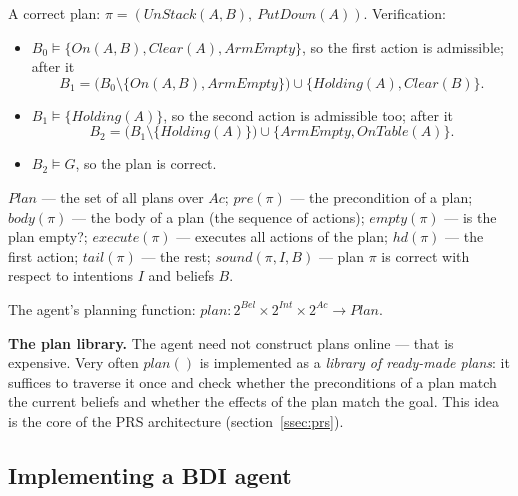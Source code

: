 \documentclass[11pt,a4paper]{article}
\theoremstyle{definition}
\begin{document}
\noindent A correct plan: $\pi = (\mathit{UnStack}(A,B),\ \mathit{PutDown}(A))$. Verification:
\begin{itemize}
\item $B_0 \models \{\mathit{On}(A,B),\mathit{Clear}(A),\mathit{ArmEmpty}\}$, so the first action
  is admissible; after it
  \[
  B_1 = \big(B_0 \setminus \{\mathit{On}(A,B),\mathit{ArmEmpty}\}\big) \cup
  \{\mathit{Holding}(A),\mathit{Clear}(B)\}.
  \]
\item $B_1 \models \{\mathit{Holding}(A)\}$, so the second action is admissible too; after it
  \[
  B_2 = \big(B_1 \setminus \{\mathit{Holding}(A)\}\big) \cup
  \{\mathit{ArmEmpty},\mathit{OnTable}(A)\}.
  \]
\item $B_2 \models G$, so the plan is correct.
\end{itemize}

\begin{defbox}
$\mathit{Plan}$ --- the set of all plans over $\mathit{Ac}$;
$\mathit{pre}(\pi)$ --- the precondition of a plan; $\mathit{body}(\pi)$ --- the body of a plan
(the sequence of actions); $\mathit{empty}(\pi)$ --- is the plan empty?;
$\mathit{execute}(\pi)$ --- executes all actions of the plan;
$\mathit{hd}(\pi)$ --- the first action; $\mathit{tail}(\pi)$ --- the rest;
$\mathit{sound}(\pi,I,B)$ --- plan $\pi$ is correct with respect to intentions $I$ and beliefs $B$.

The agent's planning function:
$\mathit{plan} : 2^{\mathit{Bel}} \times 2^{\mathit{Int}} \times 2^{\mathit{Ac}} \to \mathit{Plan}$.
\end{defbox}

\textbf{The plan library.} The agent need not construct plans online --- that is expensive. Very
often $\mathit{plan}()$ is implemented as a \emph{library of ready-made plans}: it suffices to
traverse it once and check whether the preconditions of a plan match the current beliefs and
whether the effects of the plan match the goal. This idea is the core of the PRS architecture
(section~\ref{ssec:prs}).

\subsection{Implementing a BDI agent}
\end{document}
